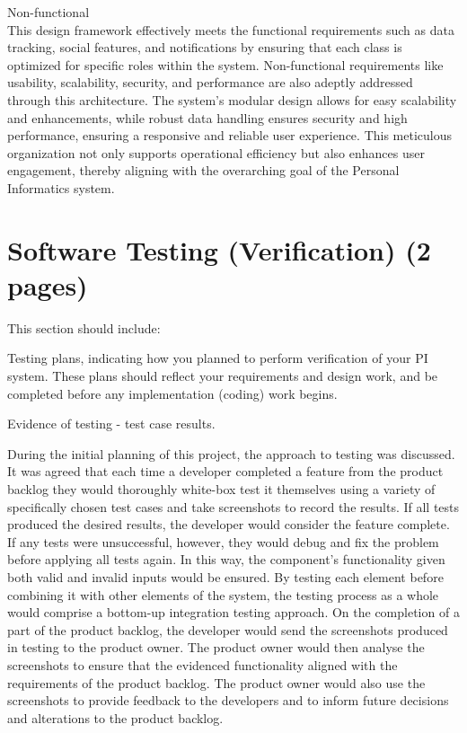 \documentclass[12pt]{article}
\begin{document}
Non-functional\\
This design framework effectively meets the functional requirements such as data tracking, social features, and notifications by ensuring that each class is optimized for specific roles within the system. Non-functional requirements like usability, scalability, security, and performance are also adeptly addressed through this architecture. The system’s modular design allows for easy scalability and enhancements, while robust data handling ensures security and high performance, ensuring a responsive and reliable user experience. This meticulous organization not only supports operational efficiency but also enhances user engagement, thereby aligning with the overarching goal of the Personal Informatics system.\par

\section{Software Testing (Verification) (2 pages)}

This section should include:

Testing plans, indicating how you planned to perform verification of your PI system.
These plans should reflect your requirements and design work, and be completed
before any implementation (coding) work begins.

Evidence of testing - test case results.

During the initial planning of this project, the approach to testing was discussed. It was agreed that each time a developer completed a feature from the product backlog they would thoroughly white-box test it themselves using a variety of specifically chosen test cases and take screenshots to record the results. If all tests produced the desired results, the developer would consider the feature complete. If any tests were unsuccessful, however, they would debug and fix the problem before applying all tests again. In this way, the component's functionality given both valid and invalid inputs would be ensured. By testing each element before combining it with other elements of the system, the testing process as a whole would comprise a bottom-up integration testing approach. On the completion of a part of the product backlog, the developer would send the screenshots produced in testing to the product owner. The product owner would then analyse the screenshots to ensure that the evidenced functionality aligned with the requirements of the product backlog. The product owner would also use the screenshots to provide feedback to the developers and to inform future decisions and alterations to the product backlog.\par
\end{document}

